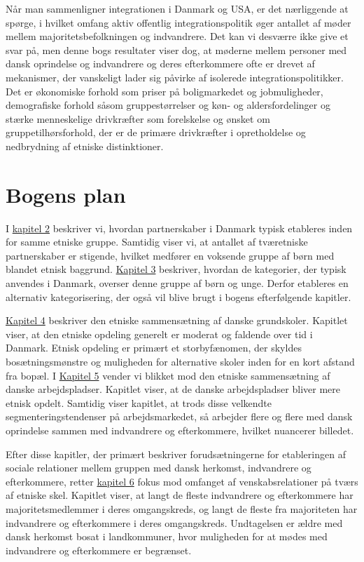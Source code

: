 \documentclass[
]{book}
\begin{document}
Når man sammenligner integrationen i Danmark og USA, er det nærliggende at spørge, i hvilket omfang aktiv offentlig integrationspolitik øger antallet af møder mellem majoritetsbefolkningen og indvandrere. Det kan vi desværre ikke give et svar på, men denne bogs resultater viser dog, at møderne mellem personer med dansk oprindelse og indvandrere og deres efterkommere ofte er drevet af mekanismer, der vanskeligt lader sig påvirke af isolerede integrationspolitikker. Det er økonomiske forhold som priser på boligmarkedet og jobmuligheder, demografiske forhold såsom gruppestørrelser og køn- og aldersfordelinger og stærke menneskelige drivkræfter som forelskelse og ønsket om gruppetilhørsforhold, der er de primære drivkræfter i opretholdelse og nedbrydning af etniske distinktioner.

\section{Bogens plan}\label{bogens-plan}

I \hyperref[kap2]{kapitel 2} beskriver vi, hvordan partnerskaber i Danmark typisk etableres inden for samme etniske gruppe. Samtidig viser vi, at antallet af tværetniske partnerskaber er stigende, hvilket medfører en voksende gruppe af børn med blandet etnisk baggrund. \hyperref[kap3]{Kapitel 3} beskriver, hvordan de kategorier, der typisk anvendes i Danmark, overser denne gruppe af børn og unge. Derfor etableres en alternativ kategorisering, der også vil blive brugt i bogens efterfølgende kapitler.

\hyperref[kap4]{Kapitel 4} beskriver den etniske sammensætning af danske grundskoler. Kapitlet viser, at den etniske opdeling generelt er moderat og faldende over tid i Danmark. Etnisk opdeling er primært et storbyfænomen, der skyldes bosætningsmønstre og muligheden for alternative skoler inden for en kort afstand fra bopæl. I \hyperref[kap5]{Kapitel 5} vender vi blikket mod den etniske sammensætning af danske arbejdspladser. Kapitlet viser, at de danske arbejdspladser bliver mere etnisk opdelt. Samtidig viser kapitlet, at trods disse velkendte segmenteringstendenser på arbejdsmarkedet, så arbejder flere og flere med dansk oprindelse sammen med indvandrere og efterkommere, hvilket nuancerer billedet.

Efter disse kapitler, der primært beskriver forudsætningerne for etableringen af sociale relationer mellem gruppen med dansk herkomst, indvandrere og efterkommere, retter \hyperref[kap6]{kapitel 6} fokus mod omfanget af venskabsrelationer på tværs af etniske skel. Kapitlet viser, at langt de fleste indvandrere og efterkommere har majoritetsmedlemmer i deres omgangskreds, og langt de fleste fra majoriteten har indvandrere og efterkommere i deres omgangskreds. Undtagelsen er ældre med dansk herkomst bosat i landkommuner, hvor muligheden for at mødes med indvandrere og efterkommere er begrænset.
\end{document}
